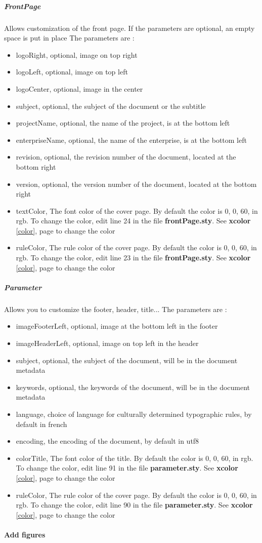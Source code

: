 \subparagraph{FrontPage}
Allows customization of the front page. If the parameters are optional, an empty space is put in place
The parameters are :
\begin{itemize}
    \item logoRight, optional, image on top right
    \item logoLeft, optional, image on top left
    \item logoCenter, optional, image in the center
    \item subject, optional, the subject of the document or the subtitle
    \item projectName, optional, the name of the project, is at the bottom left
    \item enterpriseName, optional, the name of the enterprise, is at the bottom left
    \item revision, optional, the revision number of the document, located at the bottom right
    \item version, optional, the version number of the document, located at the bottom right
    \item textColor, The font color of the cover page. By default the color is 0, 0, 60, in rgb. To change the color, edit line 24 in the file \textbf{frontPage.sty}. See \textbf{xcolor} \ref{color}, page \pageref{color} to change the color
    \item ruleColor, The rule color of the cover page. By default the color is 0, 0, 60, in rgb. To change the color, edit line 23 in the file \textbf{frontPage.sty}. See \textbf{xcolor} \ref{color}, page \pageref{color} to change the color
\end{itemize}

\subparagraph{Parameter}
Allows you to customize the footer, header, title...
The parameters are :
\begin{itemize}
    \item imageFooterLeft, optional, image at the bottom left in the footer
    \item imageHeaderLeft, optional, image on top left in the header
    \item subject, optional, the subject of the document, will be in the document metadata
    \item keywords, optional, the keywords of the document, will be in the document metadata
    \item language, choice of language for culturally determined typographic rules, by default in french \label{language}
    \item encoding, the encoding of the document, by default in utf8
    \item colorTitle, The font color of the title. By default the color is 0, 0, 60, in rgb. To change the color, edit line 91 in the file \textbf{parameter.sty}. See \textbf{xcolor} \ref{color}, page \pageref{color} to change the color
    \item ruleColor, The rule color of the cover page. By default the color is 0, 0, 60, in rgb. To change the color, edit line 90 in the file \textbf{parameter.sty}. See \textbf{xcolor} \ref{color}, page \pageref{color} to change the color
\end{itemize}

\paragraph{Add figures}

